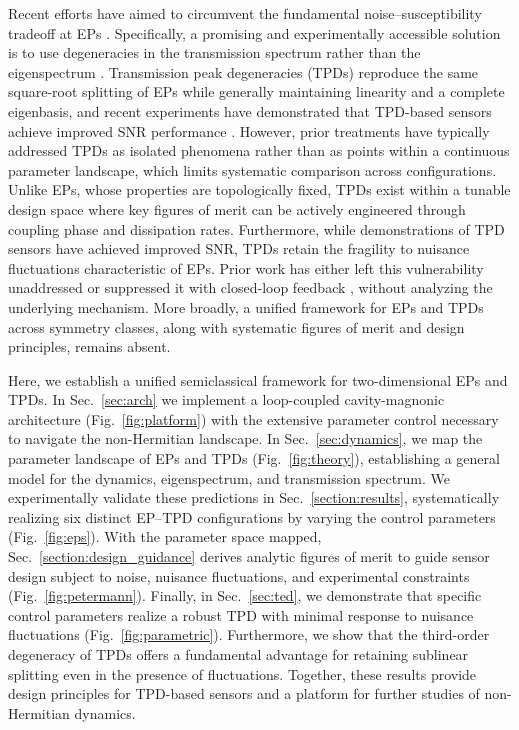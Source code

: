 \documentclass[%
  reprint,
  amsmath,amssymb,
  aps,
  prapplied,
  superscriptaddress,
  longbibliography]{revtex4-2}
\begin{document}
Recent efforts have aimed to circumvent the fundamental noise–susceptibility tradeoff at EPs \cite{lu_harnessing_2025, kononchuk_exceptional-point-based_2022, xu_single-cavity_2024, geng_discrepancy_2021}. Specifically, a promising and experimentally accessible solution is to use degeneracies in the transmission spectrum rather than the eigenspectrum \cite{geng_discrepancy_2021}. Transmission peak degeneracies (TPDs) reproduce the same square-root splitting of EPs while generally maintaining linearity and a complete eigenbasis, and recent experiments have demonstrated that TPD-based sensors achieve improved SNR performance \cite{lu_harnessing_2025, kononchuk_exceptional-point-based_2022, xu_single-cavity_2024}. However, prior treatments have typically addressed TPDs as isolated phenomena rather than as points within a continuous parameter landscape, which limits systematic comparison across configurations. Unlike EPs, whose properties are topologically fixed, TPDs exist within a tunable design space where key figures of merit can be actively engineered through coupling phase and dissipation rates. Furthermore, while demonstrations of TPD sensors have achieved improved SNR, TPDs retain the fragility to nuisance fluctuations characteristic of EPs. Prior work has either left this vulnerability unaddressed or suppressed it with closed-loop feedback \cite{lu_harnessing_2025}, without analyzing the underlying mechanism. More broadly, a unified framework for EPs and TPDs across symmetry classes, along with systematic figures of merit and design principles, remains absent.

Here, we establish a unified semiclassical framework for two-dimensional EPs and TPDs. In Sec.~\ref{sec:arch} we implement a loop-coupled cavity-magnonic architecture (Fig.~\ref{fig:platform}) with the extensive parameter control necessary to navigate the non-Hermitian landscape. In Sec.~\ref{sec:dynamics}, we map the parameter landscape of EPs and TPDs (Fig.~\ref{fig:theory}), establishing a general model for the dynamics, eigenspectrum, and transmission spectrum. We experimentally validate these predictions in Sec.~\ref{section:results}, systematically realizing six distinct EP–TPD configurations by varying the control parameters (Fig.~\ref{fig:eps}). With the parameter space mapped, Sec.~\ref{section:design_guidance} derives analytic figures of merit to guide sensor design subject to noise, nuisance fluctuations, and experimental constraints (Fig.~\ref{fig:petermann}). Finally, in Sec.~\ref{sec:ted}, we demonstrate that specific control parameters realize a robust TPD with minimal response to nuisance fluctuations (Fig.~\ref{fig:parametric}). Furthermore, we show that the third-order degeneracy of TPDs offers a fundamental advantage for retaining sublinear splitting even in the presence of fluctuations. Together, these results provide design principles for TPD-based sensors and a platform for further studies of non-Hermitian dynamics.
\end{document}

